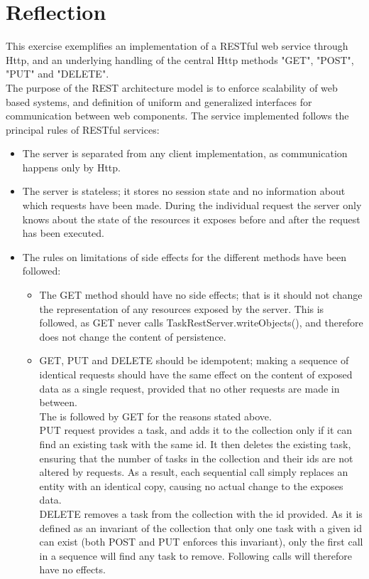\section{Reflection}
\label{rest_reflection}
This exercise exemplifies an implementation of a RESTful web service through Http, and an underlying handling of the central Http methods "GET", "POST", "PUT" and "DELETE".\\
The purpose of the REST architecture model is to enforce scalability of web based systems, and definition of uniform and generalized interfaces for communication between web components. 
The service implemented follows the principal rules of RESTful services:
\begin{itemize}
	\item The server is separated from any client implementation, as communication happens only by Http.
	\item The server is stateless; it stores no session state and no information about which requests have been made. During the individual request the server only knows about the state of the resources it exposes before and after the request has been executed. 
	\item The rules on limitations of side effects for the different methods have been followed:
	\begin{itemize}
		\item The GET method should have no side effects; that is it should not change the representation of any resources exposed by the server. This is followed, as GET never calls TaskRestServer.writeObjects(), and therefore does not change the content of persistence. 
		\item GET, PUT and DELETE should be idempotent; making a sequence of identical requests should have the same effect on the content of exposed data as a single request, provided that no other requests are made in between.\\
		The is followed by GET for the reasons stated above.\\
		PUT request provides a task, and adds it to the collection only if it can find an existing task with the same id. It then deletes the existing task, ensuring that the number of tasks in the collection and their ids are not altered by requests. As a result, each sequential call simply replaces an entity with an identical copy, causing no actual change to the exposes data.\\
		DELETE removes a task from the collection with the id provided. As it is defined as an invariant of the collection that only one task with a given id can exist (both POST and PUT enforces this invariant), only the first call in a sequence will find any task to remove. Following calls will therefore have no effects. 

\end{itemize}
\end{itemize}
